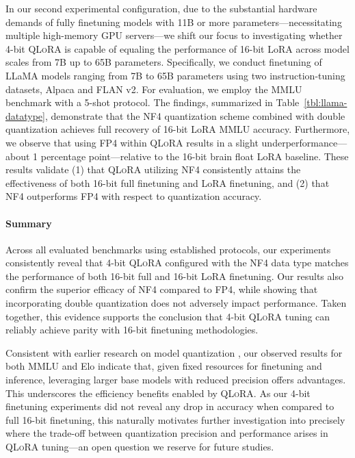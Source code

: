 In our second experimental configuration, due to the substantial hardware demands of fully finetuning models with 11B or more parameters—necessitating multiple high-memory GPU servers—we shift our focus to investigating whether 4-bit \textsc{QLoRA} is capable of equaling the performance of 16-bit LoRA across model scales from 7B up to 65B parameters. Specifically, we conduct finetuning of LLaMA models ranging from 7B to 65B parameters using two instruction-tuning datasets, Alpaca and FLAN v2. For evaluation, we employ the MMLU benchmark with a 5-shot protocol. The findings, summarized in Table~\ref{tbl:llama-datatype}, demonstrate that the NF4 quantization scheme combined with double quantization achieves full recovery of 16-bit LoRA MMLU accuracy. Furthermore, we observe that using FP4 within \textsc{QLoRA} results in a slight underperformance—about 1 percentage point—relative to the 16-bit brain float LoRA baseline. These results validate (1) that \textsc{QLoRA} utilizing NF4 consistently attains the effectiveness of both 16-bit full finetuning and LoRA finetuning, and (2) that NF4 outperforms FP4 with respect to quantization accuracy.

\paragraph{Summary} Across all evaluated benchmarks using established protocols, our experiments consistently reveal that 4-bit \textsc{QLoRA} configured with the NF4 data type matches the performance of both 16-bit full and 16-bit LoRA finetuning. Our results also confirm the superior efficacy of NF4 compared to FP4, while showing that incorporating double quantization does not adversely impact performance. Taken together, this evidence supports the conclusion that 4-bit \textsc{QLoRA} tuning can reliably achieve parity with 16-bit finetuning methodologies.

Consistent with earlier research on model quantization \citep{dettmers2022case}, our observed results for both MMLU and Elo indicate that, given fixed resources for finetuning and inference, leveraging larger base models with reduced precision offers advantages. This underscores the efficiency benefits enabled by \textsc{QLoRA}. As our 4-bit finetuning experiments did not reveal any drop in accuracy when compared to full 16-bit finetuning, this naturally motivates further investigation into precisely where the trade-off between quantization precision and performance arises in \textsc{QLoRA} tuning—an open question we reserve for future studies.

